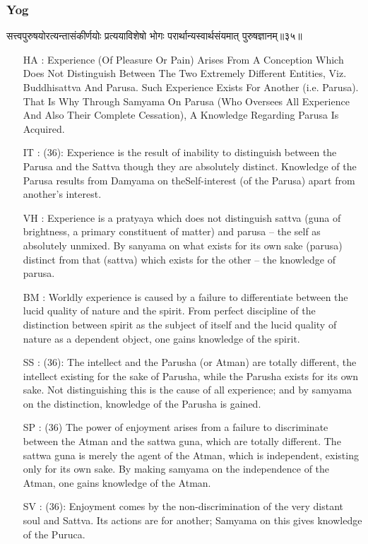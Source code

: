 \begin{frame}[fragile]\frametitle{Yog}
\begin{sanskrit}
सत्त्वपुरुषयोरत्यन्तासंकीर्णयोः प्रत्ययाविशेषो भोगः परार्थान्यस्वार्थसंयमात् पुरुषज्ञानम्॥३५॥
\end{sanskrit}

	\begin{itemize}
	\item [HA]: Experience (Of Pleasure Or Pain) Arises From A Conception Which Does Not Distinguish Between The Two Extremely Different Entities, Viz. Buddhisattva And Parusa. Such Experience Exists For Another (i.e. Parusa). That Is Why Through Samyama On Parusa (Who Oversees All Experience And Also Their Complete Cessation), A Knowledge Regarding Parusa Is Acquired.
	\item [IT]: (36): Experience is the result of inability to distinguish between the Parusa and the Sattva though they are absolutely distinct. Knowledge of the Parusa results from Damyama on theSelf-interest (of the Parusa) apart from another’s interest.
	\item [VH]: Experience is a pratyaya which does not distinguish sattva (guna of brightness, a primary constituent of matter) and parusa – the self as absolutely unmixed. By sanyama on what exists for its own sake (parusa) distinct from that (sattva) which exists for the other – the knowledge of parusa.
	\item [BM]: Worldly experience is caused by a failure to differentiate between the lucid quality of nature and the spirit. From perfect discipline of the distinction between spirit as the subject of itself and the lucid quality of nature as a dependent object, one gains knowledge of the spirit.
	\item [SS]: (36): The intellect and the Parusha (or Atman) are totally different, the intellect existing for the sake of Parusha, while the Parusha exists for its own sake. Not distinguishing this is the cause of all experience; and by samyama on the distinction, knowledge of the Parusha is gained.
	\item [SP]: (36) The power of enjoyment arises from a failure to discriminate between the Atman and the sattwa guna, which are totally different. The sattwa guna is merely the agent of the Atman, which is independent, existing only for its own sake. By making samyama on the independence of the Atman, one gains knowledge of the Atman.
	\item [SV]: (36): Enjoyment comes by the non-discrimination of the very distant soul and Sattva. Its actions are for another; Samyama on this gives knowledge of the Puruca. 
	\end{itemize}
\end{frame}


